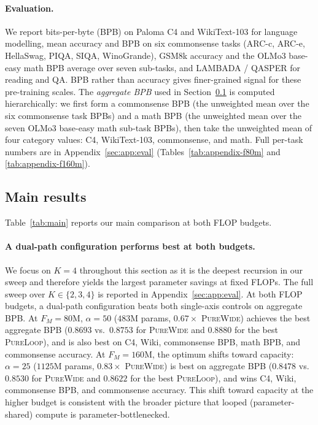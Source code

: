 \documentclass[11pt]{article}
\newcommand{\rev}[1]{{\color{red}#1}}
\begin{document}
\paragraph{Evaluation.}
We report bits-per-byte (BPB) on Paloma C4 and
WikiText-103 for language modelling, mean accuracy and BPB on six
commonsense tasks (ARC-c, ARC-e, HellaSwag, PIQA, SIQA,
WinoGrande), GSM8k accuracy and the OLMo3 base-easy math BPB
average over seven sub-tasks, and LAMBADA / QASPER for reading
and QA.  BPB rather than accuracy gives finer-grained signal
for these pre-training scales.  \rev{The \emph{aggregate BPB} used in
Section~\ref{sec:exp:main} is computed hierarchically: we first
form a commonsense BPB (the unweighted mean over the six
commonsense task BPBs) and a math BPB (the unweighted mean over
the seven OLMo3 base-easy math sub-task BPBs), then take the
unweighted mean of four category values: C4, WikiText-103,
commonsense, and math.}  Full
per-task numbers are in Appendix~\ref{sec:app:eval}
(Tables~\ref{tab:appendix-f80m} and \ref{tab:appendix-f160m}).
 
\subsection{Main results}
\label{sec:exp:main}

Table~\ref{tab:main} reports our main comparison at both FLOP
budgets. 

\paragraph{A dual-path configuration performs best at both budgets.}
We focus on $K{=}4$ throughout this section \rev{as it is the deepest recursion in our sweep and therefore yields the largest parameter savings at fixed FLOPs}. The full sweep over $K \in \{2,3,4\}$ is reported in Appendix~\ref{sec:app:eval}. At both FLOP budgets, a dual-path configuration beats both single-axis controls on aggregate BPB. At $F_M = 80$M, $\alpha = 50$ ($483$M params, $0.67\times$ \textsc{PureWide}) achieves the best aggregate BPB ($0.8693$ vs.\ $0.8753$ for \textsc{PureWide} and $0.8880$ for the best \textsc{PureLoop}), and is also best on C4, Wiki, commonsense BPB, math BPB, and commonsense accuracy. At $F_M = 160$M, the optimum shifts toward capacity: $\alpha = 25$ ($1125$M params, $0.83\times$ \textsc{PureWide}) is best on aggregate BPB ($0.8478$ vs.\ $0.8530$ for \textsc{PureWide} and $0.8622$ for the best \textsc{PureLoop}), and wins C4, Wiki, commonsense BPB, and commonsense accuracy. This shift toward capacity at the higher budget is consistent with the broader picture that looped (parameter-shared) compute is parameter-bottlenecked.
\end{document}
